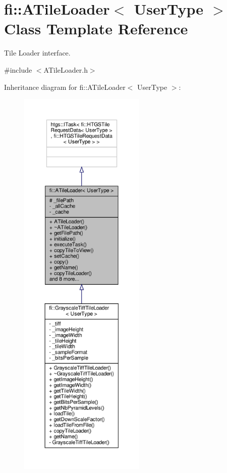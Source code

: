\hypertarget{classfi_1_1ATileLoader}{}\section{fi\+:\+:A\+Tile\+Loader$<$ User\+Type $>$ Class Template Reference}
\label{classfi_1_1ATileLoader}


Tile Loader interface.  




{\ttfamily \#include $<$A\+Tile\+Loader.\+h$>$}



Inheritance diagram for fi\+:\+:A\+Tile\+Loader$<$ User\+Type $>$\+:
\nopagebreak
\begin{figure}[H]
\begin{center}
\leavevmode
\includegraphics[height=550pt]{d0/d13/classfi_1_1ATileLoader__inherit__graph}
\end{center}
\end{figure}


